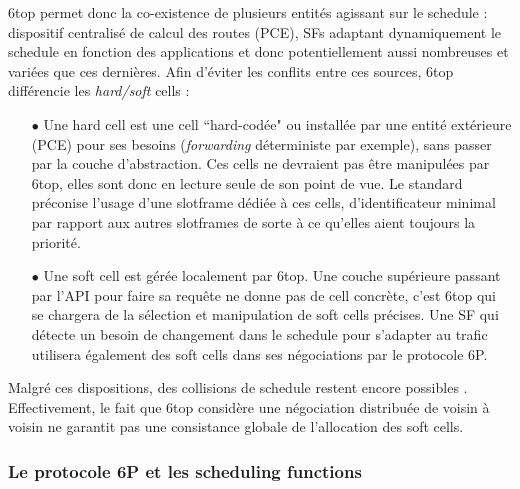 \documentclass[]{report}
\begin{document}
\par 6top permet donc la co-existence de plusieurs entités agissant sur le schedule : dispositif centralisé  de calcul des routes (PCE), SFs adaptant dynamiquement le schedule en fonction des applications et donc potentiellement aussi nombreuses et variées que ces dernières. Afin d'éviter les conflits entre ces sources, 6top différencie les \textit{hard/soft} cells :

\vspace{0.2cm}

\begin{itemize}
\item[$\bullet$] Une hard cell est une cell ``hard-codée" ou installée par une entité extérieure (PCE) pour ses besoins (\textit{forwarding} déterministe par exemple), sans passer par la couche d'abstraction. Ces cells ne devraient pas être manipulées par 6top, elles sont donc en lecture seule de son point de vue. Le standard \cite{rfc8480} préconise l'usage d'une slotframe dédiée à ces cells, d'identificateur minimal par rapport aux autres slotframes de sorte à ce qu'elles aient toujours la priorité.
\vspace{0.2cm}
\item[$\bullet$] Une soft cell est gérée localement par 6top. Une couche supérieure passant par l'API pour faire sa requête ne donne pas de cell concrète, c'est 6top qui se chargera de la sélection et manipulation de soft cells précises. Une SF qui détecte un besoin de changement dans le schedule pour s'adapter au trafic utilisera également des soft cells dans ses négociations par le protocole 6P.
\end{itemize}

\vspace{0.6cm}

\par Malgré ces dispositions, des collisions de schedule restent encore possibles \cite{ietf-6tisch-architecture-28}. Effectivement, le fait que 6top considère une négociation distribuée de voisin à voisin ne garantit pas une consistance globale de l'allocation des soft cells.

\newpage

\subsubsection{Le protocole 6P et les scheduling functions}
\end{document}
